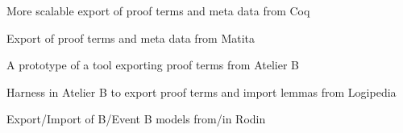 \begin{workpackage}
\begin{wpdelivs}
  \begin{wpdeliv}[due=24,id=coq2,dissem=PU,nature=OTHER,lead=Bol]{More scalable export of proof terms and meta data from Coq}
  \end{wpdeliv}

  \begin{wpdeliv}[due=12,id=matita1,dissem=PU,nature=OTHER,lead=Bol]{Export of proof terms and meta data from Matita}
  \end{wpdeliv}

  \begin{wpdeliv}[due=24,id=atelier-b,dissem=PU,nature=DEM,lead=Cle]{A prototype of a tool exporting proof terms from Atelier B}
  \end{wpdeliv}

  \begin{wpdeliv}[due=48,id=atelier-b,dissem=PU,nature=OTHER,lead=Cle]{Harness in Atelier B to export proof terms and import lemmas from Logipedia}
  \end{wpdeliv}

  \begin{wpdeliv}[due=48,id=atelier-b,dissem=PU,nature=OTHER,lead=Tou]{Export/Import of B/Event B models from/in Rodin}
  \end{wpdeliv}

\end{wpdelivs}

\end{workpackage}

